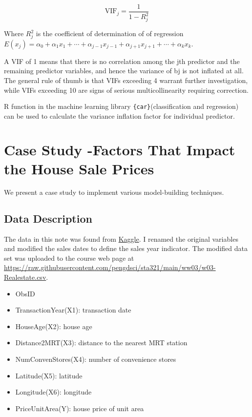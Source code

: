 \documentclass[
]{book}
\providecommand{\tightlist}{%
  \setlength{\itemsep}{0pt}\setlength{\parskip}{0pt}}
\begin{document}
\[
\text{VIF}_j = \frac{1}{1-R_j^2}
\]

Where \(R^2_j\) is the coefficient of determination of of regression \(E(x_j) = \alpha_0 + \alpha_1x_1 + \cdots+\alpha_{j-1}x_{j-1} + \alpha_{j+1}x_{j+1} + \cdots + \alpha_kx_k\).

A VIF of 1 means that there is no correlation among the jth predictor and the remaining predictor variables, and hence the variance of bj is not inflated at all. The general rule of thumb is that VIFs exceeding 4 warrant further investigation, while VIFs exceeding 10 are signs of serious multicollinearity requiring correction.

R function in the machine learning library \texttt{\{car\}}(classification and regression) can be used to calculate the variance inflation factor for individual predictor.

\hypertarget{case-study--factors-that-impact-the-house-sale-prices}{%
\section{Case Study -Factors That Impact the House Sale Prices}\label{case-study--factors-that-impact-the-house-sale-prices}}

We present a case study to implement various model-building techniques.

\hypertarget{data-description-1}{%
\subsection{Data Description}\label{data-description-1}}

The data in this note was found from \href{https://www.kaggle.com/}{Kaggle}. I renamed the original variables and modified the sales dates to define the sales year indicator. The modified data set was uploaded to the course web page at \url{https://raw.githubusercontent.com/pengdsci/sta321/main/ww03/w03-Realestate.csv}.

\begin{itemize}
\tightlist
\item
  ObsID
\item
  TransactionYear(X1): transaction date
\item
  HouseAge(X2): house age\\
\item
  Distance2MRT(X3): distance to the nearest MRT station
\item
  NumConvenStores(X4): number of convenience stores
\item
  Latitude(X5): latitude\\
\item
  Longitude(X6): longitude\\
\item
  PriceUnitArea(Y): house price of unit area
\end{itemize}
\end{document}
